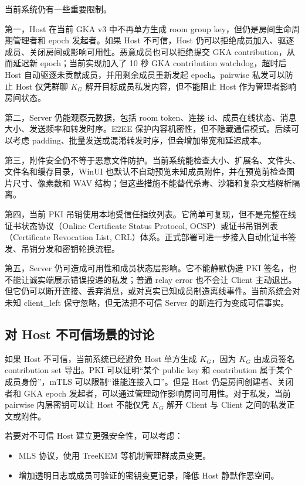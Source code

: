 \documentclass[UTF8,a4paper,12pt]{ctexart}
\begin{document}
当前系统仍有一些重要限制。

第一，Host 在当前 GKA v3 中不再单方生成 room group key，但仍是房间生命周期管理者和 epoch 发起者。如果 Host 不可信，Host 仍可以拒绝成员加入、驱逐成员、关闭房间或影响可用性。恶意成员也可以拒绝提交 GKA contribution，从而延迟新 epoch；当前实现加入了 10 秒 GKA contribution watchdog，超时后 Host 自动驱逐未贡献成员，并用剩余成员重新发起 epoch。pairwise 私发可以防止 Host 仅凭群聊 \(K_G\) 解开目标成员私发内容，但不能阻止 Host 作为管理者影响房间状态。

第二，Server 仍能观察元数据，包括 room token、连接 id、成员在线状态、消息大小、发送频率和转发时序。E2EE 保护内容机密性，但不隐藏通信模式。后续可以考虑 padding、批量发送或混淆转发时序，但会增加带宽和延迟成本。

第三，附件安全仍不等于恶意文件防护。当前系统能检查大小、扩展名、文件头、文件名和缓存目录，WinUI 也默认不自动预览未知成员附件，并在预览前检查图片尺寸、像素数和 WAV 结构；但这些措施不能替代杀毒、沙箱和复杂文档解析隔离。

第四，当前 PKI 吊销使用本地受信任指纹列表。它简单可复现，但不是完整在线证书状态协议（Online Certificate Status Protocol, OCSP）或证书吊销列表（Certificate Revocation List, CRL）体系。正式部署可进一步接入自动化证书签发、吊销分发和密钥轮换流程。

第五，Server 仍可造成可用性和成员状态层影响。它不能静默伪造 PKI 签名，也不能让诚实端展示错误投递的私发；普通 relay error 也不会让 Client 主动退出。但它仍可以断开连接、丢弃消息，或对真实已知成员制造离线事件。当前系统会对未知 client\_left 保守忽略，但无法把不可信 Server 的断连行为变成可信事实。

\subsection{对 Host 不可信场景的讨论}

如果 Host 不可信，当前系统已经避免 Host 单方生成 \(K_G\)，因为 \(K_G\) 由成员签名 contribution set 导出。PKI 可以证明“某个 public key 和 contribution 属于某个成员身份”，mTLS 可以限制“谁能连接入口”。但是 Host 仍是房间创建者、关闭者和 GKA epoch 发起者，可以通过管理动作影响房间可用性。对于私发，当前 pairwise 内层密钥可以让 Host 不能仅凭 \(K_G\) 解开 Client 与 Client 之间的私发正文或附件。

若要对不可信 Host 建立更强安全性，可以考虑：

\begin{itemize}
  \item MLS 协议，使用 TreeKEM 等机制管理群成员变更。
  \item 增加透明日志或成员可验证的密钥变更记录，降低 Host 静默作恶空间。
\end{itemize}
\end{document}
